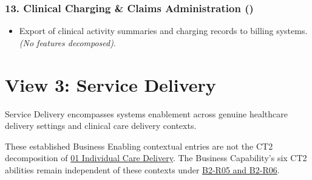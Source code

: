 \subsubsection*{13. Clinical Charging \& Claims Administration (\texttt{})}
\label{rad:enabling:347}

\begin{itemize}

\item 
Export of clinical activity summaries and charging records to billing systems. \emph{(No features decomposed)}.



\end{itemize}
\label{rad:enabling:349}

\par\smallskip
{}\label{rad:enabling:351}
\section*{View 3: Service Delivery}
\label{rad:enabling:353}

Service Delivery encompasses systems enablement across genuine healthcare delivery settings and clinical care delivery contexts.

\label{rad:enabling:355}

These established Business Enabling contextual entries are not the CT2 decomposition of \hyperref[rad:business:148]{01 Individual Care Delivery}. The Business Capability's six CT2 abilities remain independent of these contexts under \href{https://github.com/fhirfactory/harmonia/blob/98410db60155198a75f74c79d98060070209faa1/docs/markdown/02-strategy/capabilities/business-capabilities.md\#b2-r05}{B2-R05 and B2-R06}.

\label{rad:enabling:360}

